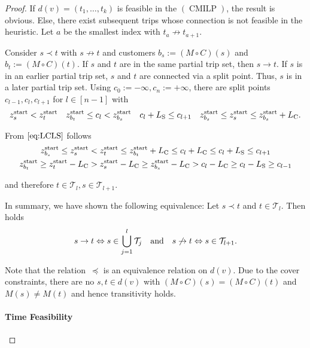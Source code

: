 \begin{proof}

If ${d(v)=\left(t_1,\dots,t_k\right)}$ is feasible in the $(\operatorname{CMILP})$, the result is obvious. Else, there exist subsequent trips whose connection is not feasible in the heuristic. Let $a$ be the smallest index with ${t_a\not\to t_{a+1}}$.

Consider ${s\prec t}$ with ${s\not\to t}$ and customers ${b_s:=\left(M\circ C\right)(s)}$ and ${b_t:=\left(M\circ C\right)(t)}$. If $s$ and $t$ are in the same partial trip set, then ${s\to t}$. If $s$ is in an earlier partial trip set, $s$ and $t$ are connected via a split point. Thus, $s$ is in a later partial trip set. Using ${c_{0}:=-\infty}, {c_n:=+\infty}$, there are split points $c_{l-1},c_l,c_{l+1}$ for $l\in[n-1]$ with
\begin{align*}
	z^{\operatorname{start}}_s < z^{\operatorname{start}}_t && z^{\operatorname{start}}_{b_t}\leq c_l <z^{\operatorname{start}}_{b_s} && c_l+L_{\operatorname{S}}\leq c_{l+1} && z^{\operatorname{start}}_{b_s}\leq z^{\operatorname{start}}_s\leq z^{\operatorname{start}}_{b_s}+L_{\operatorname{C}}.
\end{align*}

From $\eqref{eq:LCLS}$ follows
\begin{gather*}
	z^{\operatorname{start}}_{b_s} \leq z^{\operatorname{start}}_s < z^{\operatorname{start}}_t\leq z^{\operatorname{start}}_{b_t}+L_{\operatorname{C}} \leq c_l+L_{\operatorname{C}} \leq c_l+L_{\operatorname{S}} \leq c_{l+1} \\
	z^{\operatorname{start}}_{b_t} \geq z^{\operatorname{start}}_t-L_{\operatorname{C}} > z^{\operatorname{start}}_s-L_{\operatorname{C}} \geq z^{\operatorname{start}}_{b_s}-L_{\operatorname{C}} > c_l-L_{\operatorname{C}}\geq c_l-L_{\operatorname{S}}\geq c_{l-1}
\end{gather*}

and therefore $t\in\mathcal{T}_l,s\in\mathcal{T}_{l+1}$.

In summary, we have shown the following equivalence: Let ${s\prec t}$ and ${t\in\mathcal{T}_l}$. Then holds
\begin{align*}
	s\to t \Leftrightarrow s\in\bigcup_{j=1}^l \mathcal{T}_j && \text{and} && s\not\to t \Leftrightarrow s\in\mathcal{T}_{l+1}.
\end{align*}

Note that the relation~$\preceq$ is an equivalence relation on $d(v)$. Due to the cover constraints, there are no ${s,t\in d(v)}$ with ${\left(M\circ C\right)(s)=\left(M\circ C\right)(t)}$ and ${M(s)\neq M(t)}$ and hence transitivity holds.

\paragraph{Time Feasibility} \proofparfill


\end{proof}
